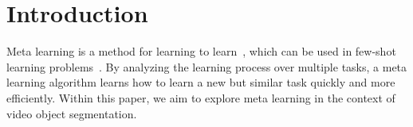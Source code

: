 \documentclass[10pt,twocolumn,letterpaper]{article}
\begin{document}
\vspace{-0.15in}\section{Introduction}%
Meta learning is a method for learning to learn~\cite{Schmidhuber, bengio:1995:oban}, which can be used in few-shot learning problems~\cite{Hugo, NIPS2016_6385, NIPS2017_6996}. By analyzing the learning process over multiple tasks, a meta learning algorithm learns how to learn a new but similar task quickly and more efficiently.
Within this paper, we aim to explore meta learning in the context of video object segmentation.
\end{document}
